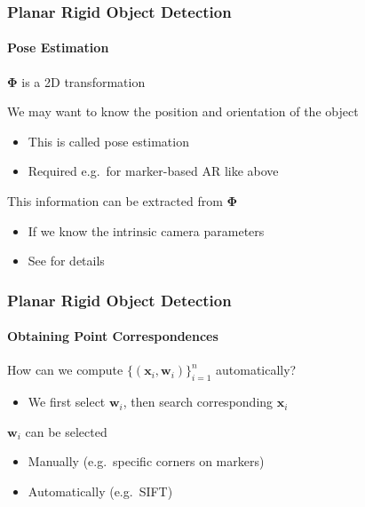 \documentclass[xetex,professionalfont]{beamer}
\renewcommand{\vec}[1]{\ensuremath{\mathbf{#1}}}
\newcommand{\vw}{\vec{w}}
\newcommand{\vx}{\vec{x}}
\renewcommand\emph[1]{\textcolor{tuwcvl_inf_red}{#1}}
\begin{document}
\begin{frame}
\frametitle{Planar Rigid Object Detection}
\framesubtitle{Pose Estimation}

$\boldsymbol{\Phi}$ is a 2D transformation

\bigskip
We may want to know the position and orientation of the object %
\begin{itemize}
    \item This is called \emph{pose estimation}
    \item Required e.g.\ for marker-based AR like above
\end{itemize}

\bigskip
This information can be extracted from $\boldsymbol{\Phi}$
\begin{itemize}
    \item If we know the intrinsic camera parameters %
    \item See \cite{prince12} for details %
\end{itemize}

\end{frame}


\begin{frame}
\frametitle{Planar Rigid Object Detection}
\framesubtitle{Obtaining Point Correspondences}

How can we compute $\{(\vx_i,\vw_i)\}_{i=1}^n$ automatically?
\begin{itemize}
    \item We first select $\vw_i$, then search corresponding $\vx_i$
\end{itemize}

\bigskip
$\vw_i$ can be selected
\begin{itemize}
    \item Manually (e.g.\ specific corners on markers)
    \item Automatically (e.g.\ SIFT)
\end{itemize}

\end{frame}

\end{document}
